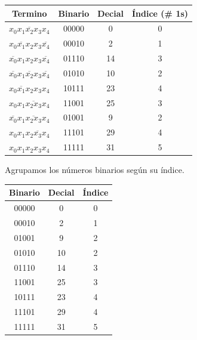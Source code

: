 \documentclass[a4paper,12pt]{article}
\begin{document}
\begin{enumerate}[label=\textcolor{teal}{\textbf{\arabic*.}}]
            \begin{table}[H]
            \centering
            \begin{tabular}{|c|c|c|c|}
                \hline
                Termino & Binario & Decial & Índice (\# 1s)\\ 
                \hline
                $\overline{x_0 x_1 x_2 x_3 x_4}$  & 00000 & 0 & 0 \\ 
                \hline 
                $\overline{x_0 x_1 x_2} x_3 \overline{x_4} $ & 00010 & 2 & 1 \\ 
                \hline 
                $\overline{x_0} x_1 x_2 x_3 \overline{x_4} $ & 01110 & 14 & 3 \\ 
                \hline 
                $ \overline{x_0} x_1 \overline{x_2} x_3 \overline{x_4}$ & 01010 & 10 & 2 \\ 
                \hline 
                $x_0 \overline{x_1} x_2 x_3 x_4$ & 10111 & 23 & 4 \\ 
                \hline 
                $x_0 x_1 \overline{ x_2 x_3} x_4 $ & 11001 & 25 & 3 \\ 
                \hline 
                $ \overline{x_0} x_1 \overline{ x_2 x_3} x_4 $ & 01001 & 9 & 2 \\
                \hline 
                $x_0 x_1 x_2 \overline{ x_3} x_4 $ & 11101 & 29 & 4 \\ 
                \hline
                $x_0 x_1 x_2 x_3 x_4 $ & 11111 & 31 & 5 \\ 
                \hline  
            \end{tabular}
        \end{table}

        Agrupamos los números binarios según su índice.\\

            \begin{table}[H]
            \centering
            \begin{tabular}{|c|c|c|}
                \hline
                Binario & Decial & Índice\\ 
                \hline
                00000 & 0 & 0 \\ 
                \hline 
                00010 & 2 & 1 \\ 
                \hline 
                01001 & 9 & 2 \\
                \hline 
                01010 & 10 & 2 \\ 
                \hline 
                01110 & 14 & 3 \\ 
                \hline 
                11001 & 25 & 3 \\ 
                \hline 
                10111 & 23 & 4 \\ 
                \hline 
                11101 & 29 & 4 \\ 
                \hline
                11111 & 31 & 5 \\ 
                \hline  
            \end{tabular}\\
        \end{table}


\end{enumerate}
\end{document}
